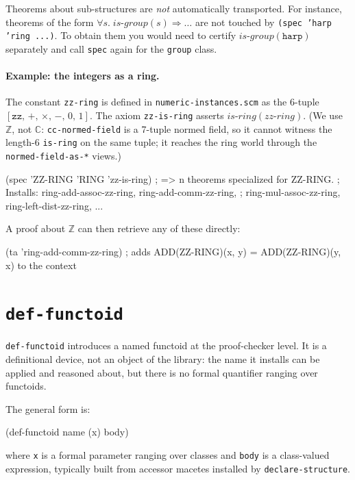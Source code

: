 \begin{remark}
Theorems about sub-structures are \emph{not} automatically transported.
For instance, theorems of the form
$\forall s.\;\mathit{is\text{-}group}(s)\Rightarrow\ldots$
are not touched by \texttt{(spec 'harp 'ring ...)}.  To obtain them you
would need to certify $\mathit{is\text{-}group}(\mathtt{harp})$ separately
and call \texttt{spec} again for the \texttt{group} class.
\end{remark}

\paragraph{Example: the integers as a ring.}
The constant \texttt{zz-ring} is defined in \texttt{numeric-instances.scm} as
the 6-tuple $[\mathtt{zz},\,+,\,\times,\,-,\,0,\,1]$.  The axiom
\texttt{zz-is-ring} asserts $\mathit{is\text{-}ring}(\mathit{zz\text{-}ring})$.
(We use $\mathbb{Z}$, not $\mathbb{C}$: \texttt{cc-normed-field} is a 7-tuple normed
field, so it cannot witness the length-6 \texttt{is-ring} on the same tuple;
it reaches the ring world through the \texttt{normed-field-as-*} views.)

\begin{VNBcode}
(spec 'ZZ-RING 'RING 'zz-is-ring)
; => n theorems specialized for ZZ-RING.
; Installs: ring-add-assoc-zz-ring, ring-add-comm-zz-ring,
;           ring-mul-assoc-zz-ring, ring-left-dist-zz-ring, ...
\end{VNBcode}

A proof about $\mathbb{Z}$ can then retrieve any of these directly:
\begin{VNBcode}
(ta 'ring-add-comm-zz-ring)
; adds  ADD(ZZ-RING)(x, y) = ADD(ZZ-RING)(y, x)  to the context
\end{VNBcode}

\section{\texttt{def-functoid}}
\label{sec:def-functoid}

\texttt{def-functoid} introduces a named functoid at the proof-checker
level.  It is a definitional device, not an object of the library: the
name it installs can be applied and reasoned about, but there is no
formal quantifier ranging over functoids.

The general form is:
\begin{VNBcode}
(def-functoid name (x) body)
\end{VNBcode}
where \texttt{x} is a formal parameter ranging over classes and
\texttt{body} is a class-valued expression, typically built from
accessor macetes installed by \texttt{declare-structure}.

